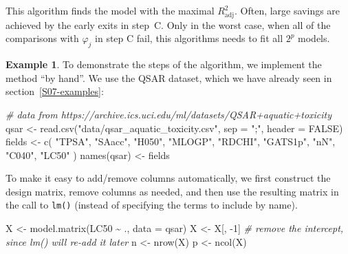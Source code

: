\documentclass[
  a4paper,
]{article}
\newenvironment{Shaded}{\begin{snugshade}}{\end{snugshade}}
\newcommand{\AttributeTok}[1]{\textcolor[rgb]{0.77,0.63,0.00}{#1}}
\newcommand{\CommentTok}[1]{\textcolor[rgb]{0.56,0.35,0.01}{\textit{#1}}}
\newcommand{\ConstantTok}[1]{\textcolor[rgb]{0.00,0.00,0.00}{#1}}
\newcommand{\DecValTok}[1]{\textcolor[rgb]{0.00,0.00,0.81}{#1}}
\newcommand{\FunctionTok}[1]{\textcolor[rgb]{0.00,0.00,0.00}{#1}}
\newcommand{\NormalTok}[1]{#1}
\newcommand{\OtherTok}[1]{\textcolor[rgb]{0.56,0.35,0.01}{#1}}
\newcommand{\SpecialCharTok}[1]{\textcolor[rgb]{0.00,0.00,0.00}{#1}}
\newcommand{\StringTok}[1]{\textcolor[rgb]{0.31,0.60,0.02}{#1}}
\theoremstyle{definition}
\theoremstyle{definition}
\newtheorem{example}{Example}[section]
\theoremstyle{definition}
\theoremstyle{definition}
\theoremstyle{remark}
\begin{document}
This algorithm finds the model with the maximal \(R^2_\mathrm{adj}\).
Often, large savings are achieved by the early exits in step~C.
Only in the worst case, when all of the comparisons with \(\varphi_j\) in step
C fail, this algorithms needs to fit all \(2^p\) models.

\begin{example}
\protect\hypertarget{exm:qsar-search}{}\label{exm:qsar-search}To demonstrate the steps of the algorithm, we implement the method
``by hand''. We use the QSAR dataset, which we have already seen
in section~\ref{S07-examples}:

\begin{Shaded}
\begin{Highlighting}[]
\CommentTok{\# data from https://archive.ics.uci.edu/ml/datasets/QSAR+aquatic+toxicity}
\NormalTok{qsar }\OtherTok{\textless{}{-}} \FunctionTok{read.csv}\NormalTok{(}\StringTok{"data/qsar\_aquatic\_toxicity.csv"}\NormalTok{,}
                 \AttributeTok{sep =} \StringTok{";"}\NormalTok{, }\AttributeTok{header =} \ConstantTok{FALSE}\NormalTok{)}
\NormalTok{fields }\OtherTok{\textless{}{-}} \FunctionTok{c}\NormalTok{(}
    \StringTok{"TPSA"}\NormalTok{,}
    \StringTok{"SAacc"}\NormalTok{,}
    \StringTok{"H050"}\NormalTok{,}
    \StringTok{"MLOGP"}\NormalTok{,}
    \StringTok{"RDCHI"}\NormalTok{,}
    \StringTok{"GATS1p"}\NormalTok{,}
    \StringTok{"nN"}\NormalTok{,}
    \StringTok{"C040"}\NormalTok{,}
    \StringTok{"LC50"}
\NormalTok{)}
\FunctionTok{names}\NormalTok{(qsar) }\OtherTok{\textless{}{-}}\NormalTok{ fields}
\end{Highlighting}
\end{Shaded}

To make it easy to add/remove columns automatically, we first construct
the design matrix, remove columns as needed, and then use the resulting
matrix in the call to \texttt{lm()} (instead of specifying the terms to include
by name).

\begin{Shaded}
\begin{Highlighting}[]
\NormalTok{X }\OtherTok{\textless{}{-}} \FunctionTok{model.matrix}\NormalTok{(LC50 }\SpecialCharTok{\textasciitilde{}}\NormalTok{ ., }\AttributeTok{data =}\NormalTok{ qsar)}
\NormalTok{X }\OtherTok{\textless{}{-}}\NormalTok{ X[, }\SpecialCharTok{{-}}\DecValTok{1}\NormalTok{] }\CommentTok{\# remove the intercept, since lm() will re{-}add it later}
\NormalTok{n }\OtherTok{\textless{}{-}} \FunctionTok{nrow}\NormalTok{(X)}
\NormalTok{p }\OtherTok{\textless{}{-}} \FunctionTok{ncol}\NormalTok{(X)}


\end{Highlighting}
\end{Shaded}
\end{example}
\end{document}
